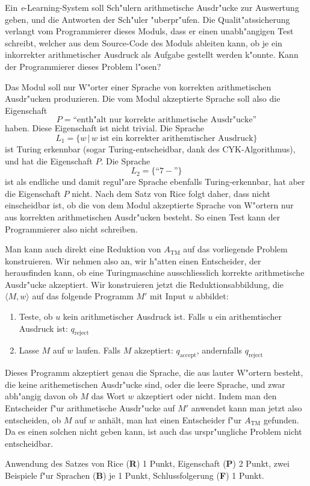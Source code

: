 Ein {\it e}-Learning-System soll Sch"ulern arithmetische Ausdr"ucke
zur Auswertung geben, und die Antworten der Sch"uler "uberpr"ufen.
Die Qualit"atssicherung verlangt vom Programmierer dieses Moduls, dass
er einen unabh"angigen Test schreibt, welcher aus dem Source-Code
des Moduls ableiten kann, ob je ein inkorrekter arithmetischer Ausdruck
als Aufgabe gestellt werden k"onnte. Kann der Programmierer dieses
Problem l"osen?

\begin{loesung}
Das Modul soll nur W"orter einer Sprache von korrekten arithmetischen
Ausdr"ucken produzieren.
Die vom Modul akzeptierte Sprache soll also die Eigenschaft
\[
P=\text{``enth"alt nur korrekte arithmetische Ausdr"ucke''}
\]
haben. 
Diese Eigenschaft ist nicht trivial. Die Sprache
\[
L_1=\{w\,|\,\text{$w$ ist ein korrekter arithemtischer Ausdruck}\}
\]
ist Turing erkennbar (sogar Turing-entscheidbar, dank des CYK-Algorithmus),
und hat die Eigenschaft $P$.
Die Sprache
\[
L_2=\{ \text{``$7-$''}\}
\]
ist als endliche und damit regul"are Sprache ebenfalls Turing-erkennbar,
hat aber die Eigenschaft $P$ nicht. Nach dem Satz von Rice folgt daher,
dass nicht einscheidbar ist, ob die von dem Modul akzeptierte Sprache
von W"ortern nur aus korrekten arithmetischen Ausdr"ucken besteht.
So einen Test kann der Programmierer also nicht schreiben.
\end{loesung}

\begin{loesung}
Man kann auch direkt eine Reduktion von $A_{\text{TM}}$ auf das vorliegende
Problem konstruieren.  Wir nehmen also an, wir h"atten einen Entscheider,
der herausfinden kann, ob eine Turingmaschine ausschliesslich korrekte
arithmetische Ausdr"ucke akzeptiert. Wir konstruieren jetzt die
Reduktionsabbildung, die $\langle M,w\rangle$ auf das folgende
Programm $M'$ mit Input $u$ abbildet:
\begin{enumerate}
\item Teste, ob $u$ kein arithmetischer Ausdruck ist. Falls 
$u$ ein arithemtischer Ausdruck ist: $q_\text{reject}$
\item Lasse $M$ auf $w$ laufen. Falls $M$ akzeptiert: $q_\text{accept}$,
andernfalls $q_\text{reject}$
\end{enumerate}
Dieses Programm akzeptiert genau die Sprache, die aus lauter W"ortern
besteht, die keine arithemetischen Ausdr"ucke sind, oder die leere
Sprache, und zwar abh"angig davon ob $M$ das Wort $w$ akzeptiert
oder nicht. Indem man den Entscheider f"ur arithmetische Ausdr"ucke
auf $M'$ anwendet kann man jetzt also entscheiden, ob $M$ auf $w$
anhält, man hat einen Entscheider f"ur $A_\text{TM}$ gefunden.
Da es einen solchen nicht geben kann, ist auch das urspr"ungliche
Problem nicht entscheidbar.
\end{loesung}

\begin{bewertung}
Anwendung des Satzes von Rice ({\bf R}) 1 Punkt,
Eigenschaft ({\bf P}) 2 Punkt,
zwei Beispiele f"ur Sprachen ({\bf B}) je 1 Punkt,
Schlussfolgerung ({\bf F}) 1 Punkt.
\end{bewertung}
